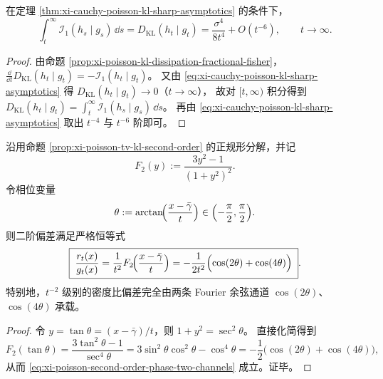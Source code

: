 \begin{corollary}\label{cor:xi-cauchy-poisson-fisher-tail-integral}
在定理 \ref{thm:xi-cauchy-poisson-kl-sharp-asymptotics} 的条件下，
\[
\int_t^\infty \mathcal I_1(h_s\mid g_s)\,\dd s
=D_{\mathrm{KL}}(h_t\mid g_t)
=\frac{\sigma^4}{8t^4}+O(t^{-6}),
\qquad t\to\infty.
\]
\end{corollary}
\begin{proof}
由命题 \ref{prop:xi-poisson-kl-dissipation-fractional-fisher}，
\(
\frac{\dd}{\dd t}D_{\mathrm{KL}}(h_t\mid g_t)=-\mathcal I_1(h_t\mid g_t)
\)。
又由 \eqref{eq:xi-cauchy-poisson-kl-sharp-asymptotics} 得 \(D_{\mathrm{KL}}(h_t\mid g_t)\to 0\)（\(t\to\infty\)），
故对 \([t,\infty)\) 积分得到
\(
D_{\mathrm{KL}}(h_t\mid g_t)=\int_t^\infty \mathcal I_1(h_s\mid g_s)\,\dd s
\)。
再由 \eqref{eq:xi-cauchy-poisson-kl-sharp-asymptotics} 取出 \(t^{-4}\) 与 \(t^{-6}\) 阶即可。
\end{proof}

\begin{proposition}\label{prop:xi-poisson-second-order-two-cosine-channels}
沿用命题 \ref{prop:xi-poisson-tv-kl-second-order} 的正规形分解，并记
\[
F_2(y):=\frac{3y^2-1}{(1+y^2)^2}.
\]
令相位变量
\[
\theta:=\arctan\!\Bigl(\frac{x-\bar\gamma}{t}\Bigr)\in\Bigl(-\frac{\pi}{2},\frac{\pi}{2}\Bigr).
\]
则二阶偏差满足严格恒等式
\begin{equation}\label{eq:xi-poisson-second-order-phase-two-channels}
\boxed{\;
\frac{r_t(x)}{g_t(x)}
=\frac{1}{t^2}F_2\!\Bigl(\frac{x-\bar\gamma}{t}\Bigr)
=-\frac{1}{2t^2}\Bigl(\cos(2\theta)+\cos(4\theta)\Bigr)\; }.
\end{equation}
特别地，\(t^{-2}\) 级别的密度比偏差完全由两条 Fourier 余弦通道 \(\cos(2\theta)\)、\(\cos(4\theta)\) 承载。
\end{proposition}

\begin{proof}
令 \(y=\tan\theta=(x-\bar\gamma)/t\)，则 \(1+y^2=\sec^2\theta\)。
直接化简得到
\[
F_2(\tan\theta)=\frac{3\tan^2\theta-1}{\sec^4\theta}
=3\sin^2\theta\cos^2\theta-\cos^4\theta
=-\frac12\bigl(\cos(2\theta)+\cos(4\theta)\bigr),
\]
从而 \eqref{eq:xi-poisson-second-order-phase-two-channels} 成立。证毕。
\end{proof}


